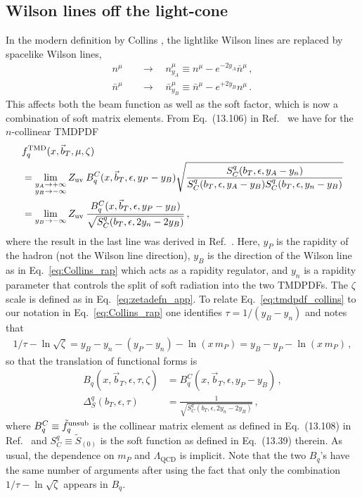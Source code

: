 \documentclass[11pt,a4paper]{article}
\DeclareRobustCommand{\eq}[1]{Eq.~\eqref{eq:#1}}
\DeclareRobustCommand{\mycite}[1]{Ref.~\cite{#1}}
\newcommand{\eps}{\epsilon}
\newcommand{\nn}{\nonumber}
\newcommand{\bn}{{\bar{n}}}
\newcommand{\LQCD}{\Lambda_\mathrm{QCD}}
\newcommand\TMD{\mathrm{TMD}}
\newcommand{\bt}{\vec b_T}
\begin{document}
\subsection{Wilson lines off the light-cone}
In the modern definition by Collins \cite{Collins:1350496},
the lightlike Wilson lines are replaced by spacelike Wilson lines,
\begin{align} \label{eq:Collins_rap}
n^\mu &\quad\to\quad n_{y_A}^\mu \equiv n^\mu - e^{-2 {y_A}} \bn^\mu
\,,\nn\\
\bn^\mu &\quad\to\quad \bn_{y_B}^\mu \equiv \bn^\mu - e^{+2 {y_B}} n^\mu
\,.\end{align}
This affects both the beam function as well as the soft factor, which is now a combination of soft matrix elements.
From Eq.~(13.106) in \mycite{Collins:1350496} we have for the $n$-collinear TMDPDF
\begin{align} \label{eq:tmdpdf_collins}
&f_{q}^\TMD(x, \bt, \mu, \zeta)
\nn\\&
= \lim_{\substack{y_A\to+\infty\\y_B\to-\infty}} Z_{\rm uv}\:
B_q^C(x, \bt, \eps, y_P- y_B) \sqrt{\frac{S^q_C(b_T,\eps, y_A-y_n)}{S^q_C(b_T,\eps,y_A-y_B) S^q_C(b_T,\eps,y_n-y_B)}}
\nn\\&
= \lim_{\substack{y_B\to-\infty}} Z_{\rm uv}\:
\frac{B_q^C(x, \bt, \eps, y_P- y_B)}{\sqrt{S^q_C(b_T,\eps,2y_n-2y_B)}}
\,,\end{align}
where the result in the last line was derived in \mycite{Buffing:2017mqm}.
Here, $y_P$ is the rapidity of the hadron (not the Wilson line direction), $y_B$ is the direction of the Wilson line as in \eq{Collins_rap} which acts as a rapidity regulator, and $y_n$ is a rapidity parameter that controls the split of soft radiation into the two TMDPDFs.
The $\zeta$ scale is defined as in \eq{zetadefn_app}.
%
To relate \eq{tmdpdf_collins} to our notation in \eq{Collins_rap} one identifies $\tau = 1/(y_B - y_n)$ and notes that
\begin{align} \label{eq:tau_Collins}
 1/\tau - \ln\sqrt{\zeta} = y_B-y_n -(y_P-y_n)-\ln (x\, m_P) = y_B-y_P-\ln(x\, m_P)
\,,\end{align}
so that the translation of functional forms is
\begin{align} \label{eq:BqDeltaC}
 B_q(x,\bt,\epsilon,\tau,\zeta) &= B_q^C(x,\bt,\epsilon,y_P-y_B)
\,,\nn\\
 \Delta_S^q(b_T,\epsilon,\tau) &= \frac{1}{\sqrt{S^q_C(b_T,\eps,2y_n-2y_B)}}
\,,\end{align}
where $B_q^C \equiv \tilde f^{\rm unsub}_q$ is the collinear matrix element as defined in Eq.\ (13.108) in \mycite{Collins:1350496} and $S^q_C \equiv \tilde S_{(0)}$ is the soft function as defined in Eq.\ (13.39) therein.
As usual, the dependence on $m_P$ and $\LQCD$ is implicit.
Note that the two $B_q$'s have the same number of arguments after using the fact that only the combination $1/\tau-\ln\sqrt{\zeta}$ appears in $B_q$.
\end{document}
